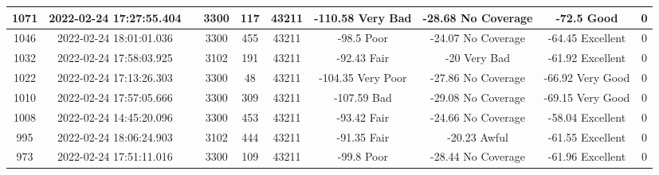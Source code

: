 \begin{longtable*}{|c|c|c|c|c|c|c|c|c|c|}
1071&2022-02-24 17:27:55.404&&3300&117&43211& -110.58   Very Bad    & -28.68    No Coverage & -72.5     Good        & 0\\\hline
{}1046&2022-02-24 18:01:01.036&&3300&455&43211& -98.5     Poor        & -24.07    No Coverage & -64.45    Excellent   & 0\\\hline
{}1032&2022-02-24 17:58:03.925&&3102&191&43211& -92.43    Fair        & -20       Very Bad    & -61.92    Excellent   & 0\\\hline
{}1022&2022-02-24 17:13:26.303&&3300&48&43211& -104.35   Very Poor   & -27.86    No Coverage & -66.92    Very Good   & 0\\\hline
{}1010&2022-02-24 17:57:05.666&&3300&309&43211& -107.59   Bad         & -29.08    No Coverage & -69.15    Very Good   & 0\\\hline
{}1008&2022-02-24 14:45:20.096&&3300&453&43211& -93.42    Fair        & -24.66    No Coverage & -58.04    Excellent   & 0\\\hline
{}995&2022-02-24 18:06:24.903&&3102&444&43211& -91.35    Fair        & -20.23    Awful       & -61.55    Excellent   & 0\\\hline
{}973&2022-02-24 17:51:11.016&&3300&109&43211& -99.8     Poor        & -28.44    No Coverage & -61.96    Excellent   & 0\\\hline

\end{longtable*}
